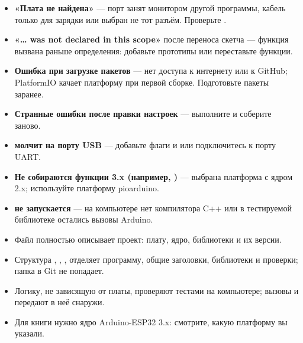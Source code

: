 \begin{trouble}
\begin{itemize}[leftmargin=*]
  \item \textbf{«Плата не найдена»} --- порт занят монитором другой программы, кабель только для зарядки
        или выбран не тот разъём. Проверьте .
  \item \textbf{«… was not declared in this scope»} после переноса скетча --- функция вызвана раньше
        определения: добавьте прототипы или переставьте функции.
  \item \textbf{Ошибка при загрузке пакетов} --- нет доступа к интернету или к GitHub; PlatformIO качает
        платформу при первой сборке. Подготовьте пакеты заранее.
  \item \textbf{Странные ошибки после правки настроек} --- выполните  и соберите заново.
  \item \textbf{ молчит на порту USB} --- добавьте флаги  и
         или подключитесь к порту UART.
  \item \textbf{Не собираются функции 3.x (например, )} --- выбрана платформа с ядром 2.x;
        используйте платформу pioarduino.
  \item \textbf{ не запускается} --- на компьютере нет компилятора C++ или в тестируемой
        библиотеке остались вызовы Arduino.
\end{itemize}
\end{trouble}

\begin{summary}
\begin{itemize}[leftmargin=*]
  \item Файл  полностью описывает проект: плату, ядро, библиотеки и их версии.
  \item Структура , , ,  отделяет программу, общие заголовки,
        библиотеки и проверки; папка  в Git не попадает.
  \item Логику, не зависящую от платы, проверяют тестами на компьютере; вызовы  и
         передают в неё снаружи.
  \item Для книги нужно ядро Arduino-ESP32 3.x: смотрите, какую платформу вы указали.
\end{itemize}
\end{summary}

